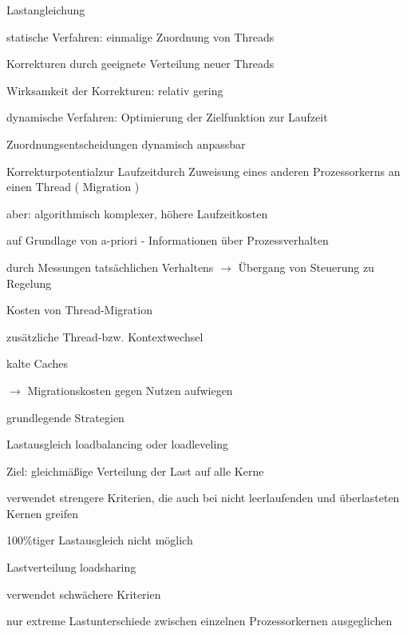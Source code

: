 \documentclass[a4paper]{article}
\begin{document}
\begin{multicols}{3}
    Lastangleichung
    \begin{itemize*}
        \item statische Verfahren: einmalige Zuordnung von Threads
        \begin{itemize*}
            \item Korrekturen durch geeignete Verteilung neuer Threads
            \item Wirksamkeit der Korrekturen: relativ gering
        \end{itemize*}
        \item dynamische Verfahren: Optimierung der Zielfunktion zur Laufzeit
        \begin{itemize*}
            \item Zuordnungsentscheidungen dynamisch anpassbar
            \item Korrekturpotentialzur Laufzeitdurch Zuweisung eines anderen Prozessorkerns an einen Thread ( Migration )
            \item aber: algorithmisch komplexer, höhere Laufzeitkosten
            \item auf Grundlage von a-priori - Informationen über Prozessverhalten
            \item durch Messungen tatsächlichen Verhaltens $\rightarrow$ Übergang von Steuerung zu Regelung
        \end{itemize*}
        \item Kosten von Thread-Migration
        \begin{itemize*}
            \item zusätzliche Thread-bzw. Kontextwechsel
            \item kalte Caches
            \item[$\rightarrow$] Migrationskosten gegen Nutzen aufwiegen
        \end{itemize*}
    \end{itemize*}

    grundlegende Strategien
    \begin{description*}
        \item[Lastausgleich] loadbalancing oder loadleveling
        \begin{itemize*}
            \item Ziel: gleichmäßige Verteilung der Last auf alle Kerne
            \item verwendet strengere Kriterien, die auch bei nicht leerlaufenden und überlasteten Kernen greifen
            \item 100\%tiger Lastausgleich nicht möglich %
        \end{itemize*}
        \item[Lastverteilung] loadsharing
        \begin{itemize*}
            \item verwendet schwächere Kriterien
            \item nur extreme Lastunterschiede zwischen einzelnen Prozessorkernen ausgeglichen %
        \end{itemize*}
    \end{description*}


\end{multicols}
\end{document}
